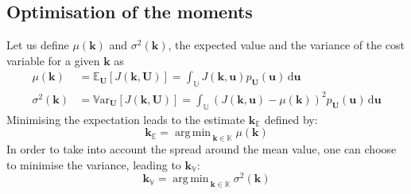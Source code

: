 \documentclass[preprint, review, 1p]{elsarticle}
\DeclareMathOperator*{\argmin}{arg\,min \,}
\newcommand{\Var}{\mathbb{V}\textrm{ar}}
\newcommand{\Ex}{\mathbb{E}}
\newcommand{\Prob}{\mathbb{P}}
\newcommand{\kmean}{{\mathbf{k}}_{\Ex}}
\newcommand{\kvar}{{\mathbf{k}}_{\mathbb{V}}}
\newcommand{\Kspace}{\mathbb{K}}
\newcommand{\Uspace}{\mathbb{U}}
\begin{document}
\subsection{Optimisation of the moments}

Let us define $\mu(\mathbf{k})$ and $\sigma^2(\mathbf{k})$, the expected value and the variance of the cost variable  for a given $\mathbf{k}$ as 
\begin{align}
  \label{eq:def_mu}
  \mu(\mathbf{k}) &= \Ex_{\mathbf{U}}\left[J(\mathbf{k},\mathbf{U})\right] = %
   \int_{\Uspace} J(\mathbf{k},\mathbf{u})p_{\mathbf{U}}(\mathbf{u}) \, \mathrm{d}\mathbf{u} \\
  \label{eq:def_sigma2}
  \sigma^2(\mathbf{k}) &= \Var_{\mathbf{U}}\left[J(\mathbf{k},\mathbf{U})\right] 
   =\int_{\Uspace} \left(J(\mathbf{k},\mathbf{u}) - \mu(\mathbf{k})\right)^2 p_{\mathbf{U}}(\mathbf{u})\, \mathrm{d}\mathbf{u}
\end{align} 
%
Minimising the expectation leads to the estimate $\kmean$ defined by:
\begin{equation}
  \label{eq:stoch_opt_def_mean}
  \kmean = \argmin_{\mathbf{k}\in\Kspace} \mu(\mathbf{k})
\end{equation}
In order to take into account the spread around the mean value, one can choose to minimise the variance, leading to $\kvar$:
\begin{equation}
  \label{eq:stoch_opt_def_var}
  \kvar = \argmin_{\mathbf{k} \in \Kspace} \sigma^2(\mathbf{k})
\end{equation}
\end{document}
